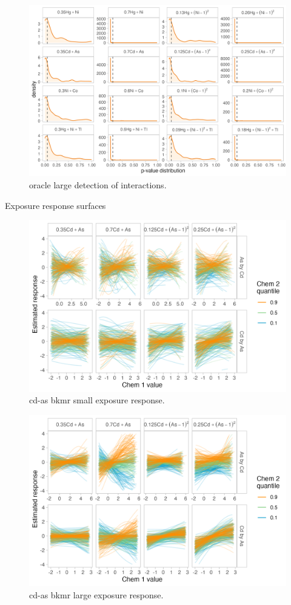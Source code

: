 \documentclass[12pt, twoside]{amherstthesis}
\begin{document}
\begin{figure}

{\centering \includegraphics[width=0.75\linewidth]{figures/ch4_olg_biv_pval} 

}

\caption{oracle large detection of interactions.}\label{fig:olgbivp}
\end{figure}
Exposure response surfaces
\begin{figure}

{\centering \includegraphics[width=0.75\linewidth]{figures/ch4_ksm_biv_expresp_2} 

}

\caption{cd-as bkmr small exposure response.}\label{fig:ksmcdas}
\end{figure}
\begin{figure}

{\centering \includegraphics[width=0.75\linewidth]{figures/ch4_klg_biv_expresp_2} 

}

\caption{cd-as bkmr large exposure response.}\label{fig:klgcdas}
\end{figure}
\end{document}
